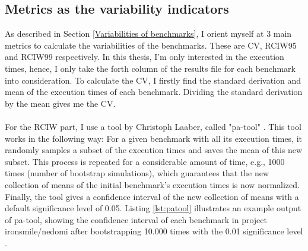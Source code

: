 \documentclass{seal_thesis}
\begin{document}
\subsection{Metrics as the variability indicators}

As described in Section \ref{Variabilities of benchmarks}, I orient myself at 3 main metrics to calculate the variabilities of the benchmarks. These are CV, RCIW95 and RCIW99 respectively. In this thesis, I'm only interested in the execution times, hence, I only take the forth column of the results file for each benchmark into consideration. To calculate the CV, I firstly find the standard derivation and mean of the execution times of each benchmark. Dividing the standard derivation by the mean gives me the CV.\\
\\
For the RCIW part, I use a tool by Christoph Laaber, called "pa-tool" \cite{patool}. This tool works in the following way: For a given benchmark with all its execution times, it randomly samples a subset of the execution times and saves the mean of this new subset. This process is repeated for a considerable amount of time, e.g., 1000 times (number of bootstrap simulations), which guarantees that the new collection of means of the initial benchmark's execution times is now normalized. Finally, the tool gives a confidence interval of the new collection of means with a default significance level of 0.05. Listing \ref{lst:patool} illustrates an example output of pa-tool, showing the confidence interval of each benchmark in project ironsmile/nedomi after bootstrapping 10.000 times with the 0.01 significance level \cite{ironsmile/nedomi}.
\end{document}
